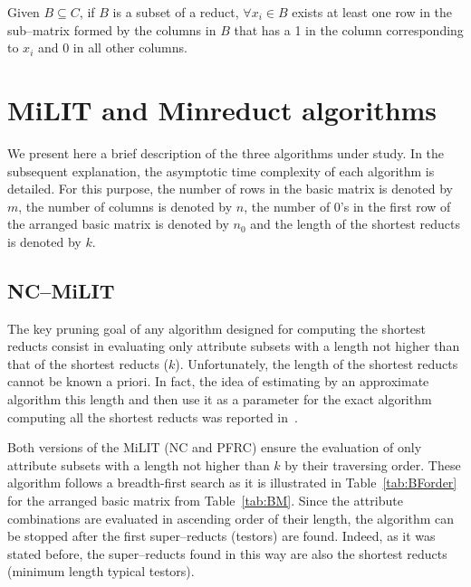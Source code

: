 \documentclass[citenumber]{llncs}
\begin{document}
	\begin{proposition}\label{prop:exclusion} 
		Given $B \subseteq C$, if $B$ is a subset of a reduct, $\forall x_i \in B$ exists at least one row in the sub--matrix formed by the columns in $B$ that has a 1 in the column corresponding to $x_i$ and 0 in all other columns.
	\end{proposition}
	
%
\section{MiLIT and Minreduct algorithms} \label{Algs}
%
	We present here a brief description of the three algorithms under study. In the subsequent explanation, the asymptotic time complexity of each algorithm is detailed. For this purpose, the number of rows in the basic matrix is denoted by $m$, the number of columns is denoted by $n$, the number of 0's in the first row of the arranged basic matrix is denoted by $n_0$ and the length of the shortest reducts is denoted by $k$.
%	
\subsection{NC--MiLIT}	
%
	The key pruning goal of any algorithm designed for computing the shortest reducts consist in evaluating only attribute subsets with a length not higher than that of the shortest reducts ($k$). Unfortunately, the length of the shortest reducts cannot be known a priori. In fact, the idea of estimating by an approximate algorithm this length and then use it as a parameter for the exact algorithm computing all the shortest reducts was reported in~\cite{Lin04}.
	
	Both versions of the MiLIT (NC and PFRC) ensure the evaluation of only attribute subsets with a length not higher than $k$ by their traversing order. These algorithm follows a breadth-first search as it is illustrated in Table~\ref{tab:BForder} for the arranged basic matrix from Table~\ref{tab:BM}. Since the attribute combinations are evaluated in ascending order of their length, the algorithm can be stopped after the first super--reducts (testors) are found. Indeed, as it was stated before, the super--reducts found in this way are also the shortest reducts (minimum length typical testors).
\end{document}
